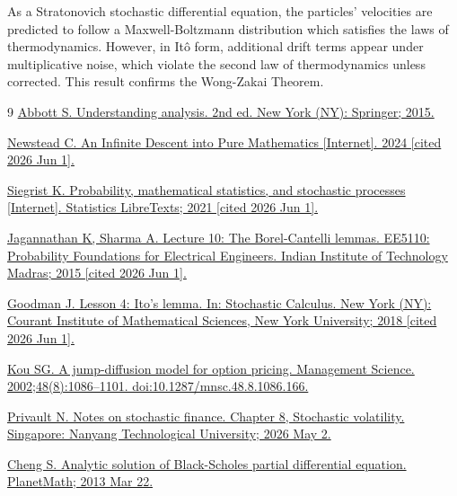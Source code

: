 \documentclass[12pt]{article}
\theoremstyle{definition}
\theoremstyle{plain}
\theoremstyle{remark}
\begin{document}
As a Stratonovich stochastic differential equation, the particles' velocities are predicted to follow a Maxwell-Boltzmann distribution which satisfies the laws of thermodynamics.  However, in It\^o form, additional drift terms appear under multiplicative noise, which violate the second law of thermodynamics unless corrected.  This result confirms the Wong-Zakai Theorem.

\newpage

\begin{thebibliography}{9}
 \href{https://ndl.ethernet.edu.et/bitstream/123456789/88631/1/2015_Book_UnderstandingAnalysis.pdf}{Abbott S. Understanding analysis. 2nd ed. New York (NY): Springer; 2015.}

 \href{https://infinitedescent.xyz/}{Newstead C. An Infinite Descent into Pure Mathematics [Internet]. 2024 [cited 2026 Jun 1].}

 \href{https://stats.libretexts.org/Bookshelves/Probability_Theory/Probability_Mathematical_Statistics_and_Stochastic_Processes_(Siegrist)/06%3A_Random_Samples/6.04%3A_The_Central_Limit_Theorem}{Siegrist K. Probability, mathematical statistics, and stochastic processes [Internet]. Statistics LibreTexts; 2021 [cited 2026 Jun 1].}

 \href{https://www.ee.iitm.ac.in/~krishnaj/EE5110_files/notes/lecture10_bclemma.pdf}{Jagannathan K, Sharma A. Lecture 10: The Borel-Cantelli lemmas. EE5110: Probability Foundations for Electrical Engineers. Indian Institute of Technology Madras; 2015 [cited 2026 Jun 1].}

 \href{https://math.nyu.edu/~goodman/teaching/StochCalc2018/notes/Lesson4.pdf}{Goodman J. Lesson 4: Ito's lemma. In: Stochastic Calculus. New York (NY): Courant Institute of Mathematical Sciences, New York University; 2018 [cited 2026 Jun 1].}

 \href{https://www.columbia.edu/~sk75/MagSci02.pdf}{Kou SG. A jump-diffusion model for option pricing. Management Science. 2002;48(8):1086–1101. doi:10.1287/mnsc.48.8.1086.166.}

 \href{https://personal.ntu.edu.sg/nprivault/MA5182/stochastic-volatility.pdf}{Privault N. Notes on stochastic finance. Chapter 8, Stochastic volatility. Singapore: Nanyang Technological University; 2026 May 2.}

 \href{https://planetmath.org/analyticsolutionofblackscholespde}{Cheng S. Analytic solution of Black-Scholes partial differential equation. PlanetMath; 2013 Mar 22.}


\end{thebibliography}
\end{document}
